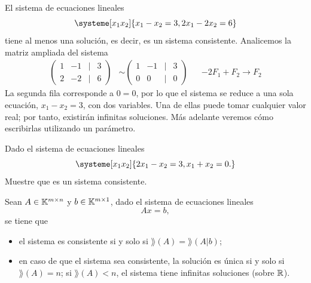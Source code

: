 \documentclass[compacto,10pt]{pubciencias-notas}
\begin{document}
\begin{ejem}\hspace{0pt} 
El sistema de ecuaciones lineales
\[
    \systeme[x_1 x_2]{x_1 -x_2 = 3,
        2x_1 -2x_2 = 6}
\]
tiene al menos una solución, es decir, es un sistema consistente. Analicemos la matriz ampliada del sistema
\begin{align*}
    \begin{pmatrix}
    1&-1&|&3\\
    2&-2&|&6
    \end{pmatrix}
    &\sim
    \begin{pmatrix}
    1&-1&|&3\\
    0&0&|&0
    \end{pmatrix} 
    && -2F_{1} + F_{2} \to F_{2}
\end{align*}
La segunda fila corresponde a $0=0$, por lo que el sistema se reduce
a una sola ecuación, $x_1-x_2=3$, con dos variables. Una de ellas puede
tomar cualquier valor real; por tanto,
existirán infinitas soluciones. Más adelante veremos cómo escribirlas
utilizando un parámetro.
\end{ejem}

\begin{ejer}\hspace{0pt} 
Dado el sistema de ecuaciones lineales
\[
    \systeme[x_1 x_2]{2x_1 -x_2 = 3,
        x_1 +x_2 = 0.}
\]
Muestre que es un sistema consistente.
\end{ejer}

\begin{teo}\label{sem03cl01:rouche-frobenius}
    Sean $A\in \Mat[\K]{m}{n}$ y $b\in \Mat[\K]{m}{1}$, dado el sistema de ecuaciones lineales
    \[
        Ax=b,
    \]
    se tiene que
    \begin{itemize}
    \item
        el sistema es consistente si y solo si $\rang(A)=\rang(A|b)$;
    \item
        en caso de que el sistema sea consistente, la solución es única si y solo si $\rang(A)=n$; si $\rang(A)<n$, el sistema tiene infinitas soluciones (sobre $\R$).
    \end{itemize}
\end{teo}
\end{document}
